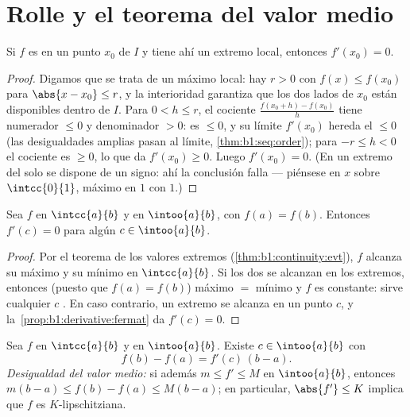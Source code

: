 \section{Rolle y el teorema del valor medio}

\begin{proposition}\label{prop:b1:derivative:fermat}
Si $f$ es  en un punto \emph{} $x_0$ de $I$ y tiene
ahí un extremo local, entonces $f'(x_0) = 0$.
\end{proposition}

\begin{proof}
Digamos que se trata de un máximo local: hay $r > 0$ con
$f(x) \leq f(x_0)$ para $\abs{x - x_0} \leq r$, y la interioridad
garantiza que los dos lados de $x_0$ están disponibles dentro de $I$.
Para $0 < h \leq r$, el cociente $\frac{f(x_0 + h) - f(x_0)}{h}$ tiene
numerador $\leq 0$ y denominador $> 0$: es $\leq 0$, y su límite
$f'(x_0)$ hereda el $\leq 0$ (las desigualdades amplias pasan al
límite, \cref{thm:b1:seq:order}); para $-r \leq h < 0$ el cociente es
$\geq 0$, lo que da $f'(x_0) \geq 0$. Luego $f'(x_0) = 0$. (En un
extremo del  solo se dispone de un signo: ahí la conclusión
falla --- piénsese en $x$ sobre $\intcc{0}{1}$, máximo en $1$ con
 $1$.)
\end{proof}

\begin{theorem}[Rolle]\label{thm:b1:derivative:rolle}
Sea $f$  en $\intcc{a}{b}$ y  en $\intoo{a}{b}$,
con $f(a) = f(b)$. Entonces $f'(c) = 0$ para algún
$c \in \intoo{a}{b}$.
\end{theorem}

\begin{proof}
Por el teorema de los valores extremos
(\cref{thm:b1:continuity:evt}), $f$ alcanza su máximo y su mínimo en
$\intcc{a}{b}$. Si los dos se alcanzan en los extremos, entonces
(puesto que $f(a) = f(b)$) máximo $=$ mínimo y $f$ es constante:
sirve cualquier $c$ . En caso contrario, un extremo se
alcanza en un punto  $c$, y
la~\cref{prop:b1:derivative:fermat} da $f'(c) = 0$.
\end{proof}

\begin{theorem}\label{thm:b1:derivative:mvt}
Sea $f$  en $\intcc{a}{b}$ y  en $\intoo{a}{b}$.
Existe $c \in \intoo{a}{b}$ con
\[
f(b) - f(a) = f'(c)\,(b - a) .
\]
\emph{Desigualdad del valor medio:} si además $m \leq f' \leq M$ en
$\intoo{a}{b}$, entonces $m(b-a) \leq f(b) - f(a) \leq M(b-a)$; en
particular, $\abs{f'} \leq K$ implica que $f$ es $K$-lipschitziana.
\end{theorem}

